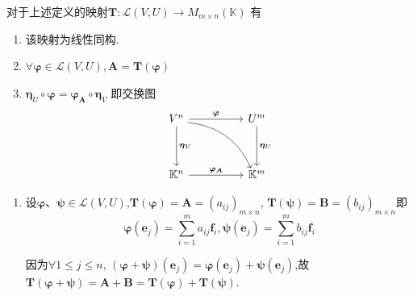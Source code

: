 \begin{formal}
\begin{theorem}[矩阵与线性映射及交换图]\label{thm:矩阵与线性映射及交换图}
    对于上述定义的映射$\bm{T}:
    \mathcal{L}\left(V,U\right)
    \longrightarrow
    M_{m \times n}\left(\mathbb{K}\right)$
    有
    \begin{enumerate}[label=\textup{(\arabic*)}]
        \item 该映射为线性同构.
        \item $\forall \bm{\varphi}\in \mathcal{L}\left(
            V,U
        \right),\bm{A} = \bm{T}
        \left(\bm{\varphi}\right)$
        \item $\bm{\eta}_U \circ \bm{\varphi} = 
        \bm{\varphi}_{\bm{A}}\circ \bm{\eta}_V$
        即交换图
        \[
        \begin{tikzcd}
V^n \arrow[rr, "\bm{\varphi}"] \arrow[dd, "\bm{\eta}_V"] \arrow[rrdd, bend left, shift right] &  & U^m \arrow[dd, "\bm{\eta}_U"] \\
                                                                                    &  &                          \\
\mathbb{K}^n \arrow[rr, "\bm{\varphi}_{\bm{A}}"]                                              &  & \mathbb{K}^m            
\end{tikzcd}
        \]
    \end{enumerate}
\end{theorem}
\begin{Proof}
    \begin{enumerate}[label=\textup{(\arabic*)}]
        \item 设$\bm{\varphi}$、$\bm{\psi}\in \mathcal{L}\left(V,U
        \right)$,$\bm{T}\left(\bm{\varphi}\right)=\bm{A}=\left(a_{ij}\right)_{m\times n}$,
        $\bm{T}\left(\bm{\psi}\right)=\bm{B}=\left(
            b_{ij}
        \right)_{m\times n}$即
        \[
        \bm{\varphi}\left(\bm{e}_j\right)=
        \sum_{i=1}^{m}a_{ij}\bm{f}_i,
        \bm{\psi}\left(\bm{e}_j\right)=
        \sum_{i=1}^{m}b_{ij}\bm{f}_i
        \]

        因为$\forall 1\leqslant j\leqslant n$,
        $\left(\bm{\varphi}+\bm{\psi}\right)\left(\bm{e}_j\right)=
        \bm{\varphi}\left(
            \bm{e}_j
        \right)+\bm{\psi}\left(
            \bm{e}_j
        \right)$,故
        $\bm{T}\left(
            \bm{\varphi}+\bm{\psi}
        \right)=\bm{A}+\bm{B}=
        \bm{T}\left(\bm{\varphi}\right)
        +\bm{T}\left(\bm{\psi}\right)$.
        

\end{enumerate}
\end{Proof}
\end{formal}
